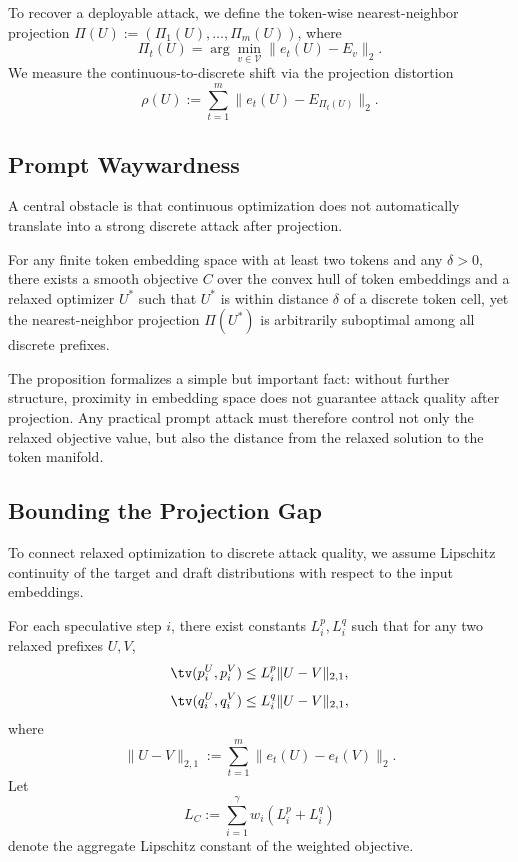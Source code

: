 To recover a deployable attack, we define the token-wise nearest-neighbor
projection $\Pi(U) := (\Pi_1(U), \dots, \Pi_m(U))$, where
\[
\Pi_t(U) = \arg\min_{v \in \mathcal{V}} \|e_t(U) - E_v\|_2.
\]
We measure the continuous-to-discrete shift via the projection distortion
\[
\rho(U) := \sum_{t=1}^{m} \|e_t(U) - E_{\Pi_t(U)}\|_2.
\]

\subsection{Prompt Waywardness}

A central obstacle is that continuous optimization does not automatically
translate into a strong discrete attack after projection.

\begin{proposition}
\label{prop:waywardness}
For any finite token embedding space with at least two tokens and any
$\delta > 0$, there exists a smooth objective $C$ over the convex hull of token
embeddings and a relaxed optimizer $U^*$ such that $U^*$ is within distance
$\delta$ of a discrete token cell, yet the nearest-neighbor projection
$\Pi(U^*)$ is arbitrarily suboptimal among all discrete prefixes.
\end{proposition}

The proposition formalizes a simple but important fact: without further
structure, proximity in embedding space does not guarantee attack quality after
projection. Any practical prompt attack must therefore control not only the
relaxed objective value, but also the distance from the relaxed solution to the
token manifold.

\subsection{Bounding the Projection Gap}

To connect relaxed optimization to discrete attack quality, we assume
Lipschitz continuity of the target and draft distributions with respect to the
input embeddings.

\begin{assumption}[TV-Lipschitzness]
\label{assump:tv-lipschitz}
For each speculative step $i$, there exist constants $L_i^p, L_i^q$ such that
for any two relaxed prefixes $U, V$,
\[
\tv(p_i^U, p_i^V) \le L_i^p \|U - V\|_{2,1},
\]
\[
\tv(q_i^U, q_i^V) \le L_i^q \|U - V\|_{2,1},
\]
where
\[
\|U - V\|_{2,1} := \sum_{t=1}^{m} \|e_t(U) - e_t(V)\|_2.
\]
Let
\[
L_C := \sum_{i=1}^{\gamma} w_i (L_i^p + L_i^q)
\]
denote the aggregate Lipschitz constant of the weighted objective.
\end{assumption}

